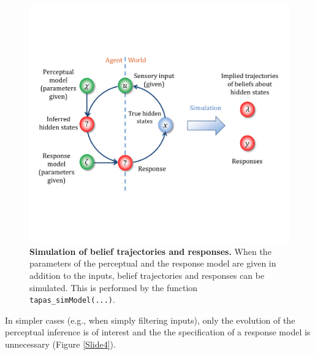 \documentclass[11pt,a4paper]{article}
\numberwithin{equation}{section}
\begin{document}
\begin{figure}[h]
\renewcommand{\baselinestretch}{1}
\begin{center}
\includegraphics[width=14cm]{Graphics/Slide3}

\vspace{1ex}
\parbox{14cm}{\caption{\label{Slide3}
\textbf{\upshape Simulation of belief trajectories and responses.}
When the parameters of the perceptual and the response model are given
in addition to the inputs, belief trajectories and responses can be
simulated. This is performed by the function \texttt{\upshape
  tapas\_simModel(...)}.}}
\end{center}
\end{figure}
 
In simpler cases (e.g., when simply filtering inputs), only the
evolution of the perceptual inference is of interest and the the
specification of a response model is unnecessary (Figure
\ref{Slide4}).
\end{document}
